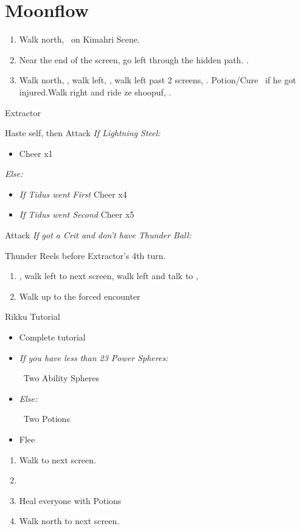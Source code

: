 \chapter{Moonflow}

\begin{enumerate}
  \item Walk north, \sd\ on Kimahri Scene.
  \item Near the end of the screen, go left through the hidden path. .
  \item Walk north, \sd, walk left, \sd, walk left past 2 screens, \sd.  Potion/Cure \tidus\ if he got injured.Walk right and ride ze shoopuf, \sd.
\end{enumerate}
\begin{battle}[4000]{Extractor}
  \begin{itemize}
    \tidusf Haste self, then \wakka
    \wakkaf Attack
    \tidusf \textit{If Lightning Steel:}
    \begin{itemize}
      \item Cheer x1
    \end{itemize}
    \textit{Else:}
    \begin{itemize}
      \item \textit{If Tidus went First} Cheer x4
      \item \textit{If Tidus went Second} Cheer x5
    \end{itemize}
    \tidusf Attack
    \textit{If got a Crit and don't have Thunder Ball:}
    \begin{itemize}
    	\wakkaf \od Thunder Reels before Extractor's 4th turn.
	\end{itemize}
  \end{itemize}
\end{battle}
\begin{enumerate}[resume]
  \item \sd, walk left to next screen, walk left and talk to \rikku, \sd
  \item Walk up to the forced encounter
\end{enumerate}
\begin{battle}{Rikku Tutorial}
  \begin{itemize}
    \item Complete tutorial
    \item \textit{If you have less than 23 Power Spheres:}
          \begin{itemize}
            \rikkuf \od\ Two Ability Spheres
          \end{itemize}
    \item \textit{Else:}
          \begin{itemize}
            \rikkuf \od\ Two Potions
          \end{itemize}
    \item Flee
  \end{itemize}
\end{battle}
\begin{enumerate}[resume]
  \item Walk to next screen.
  \item \formation{\tidus}{\wakka}{\auron}
  \item Heal everyone with Potions
  \item Walk north to next screen.
\end{enumerate}
